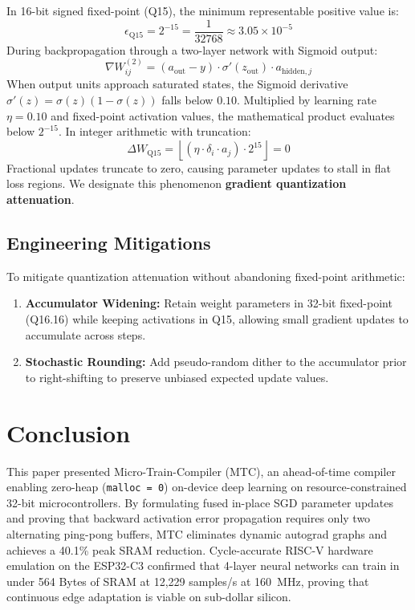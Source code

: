 \documentclass[conference]{IEEEtran}
\begin{document}
In 16-bit signed fixed-point (Q15), the minimum representable positive value is:
\begin{equation}
    \epsilon_{\text{Q15}} = 2^{-15} = \frac{1}{32768} \approx 3.05 \times 10^{-5}
\end{equation}
During backpropagation through a two-layer network with Sigmoid output:
\begin{equation}
    \nabla W_{ij}^{(2)} = (a_{\text{out}} - y) \cdot \sigma'(z_{\text{out}}) \cdot a_{\text{hidden}, j}
\end{equation}
When output units approach saturated states, the Sigmoid derivative $\sigma'(z) = \sigma(z)(1 - \sigma(z))$ falls below $0.10$. Multiplied by learning rate $\eta = 0.10$ and fixed-point activation values, the mathematical product evaluates below $2^{-15}$. In integer arithmetic with truncation:
\begin{equation}
    \Delta W_{\text{Q15}} = \left\lfloor (\eta \cdot \delta_i \cdot a_j) \cdot 2^{15} \right\rfloor = 0
\end{equation}
Fractional updates truncate to zero, causing parameter updates to stall in flat loss regions. We designate this phenomenon \textbf{gradient quantization attenuation}.

\subsection{Engineering Mitigations}
To mitigate quantization attenuation without abandoning fixed-point arithmetic:
\begin{enumerate}
    \item \textbf{Accumulator Widening:} Retain weight parameters in 32-bit fixed-point (Q16.16) while keeping activations in Q15, allowing small gradient updates to accumulate across steps.
    \item \textbf{Stochastic Rounding:} Add pseudo-random dither to the accumulator prior to right-shifting to preserve unbiased expected update values.
\end{enumerate}

\section{Conclusion}

This paper presented Micro-Train-Compiler (MTC), an ahead-of-time compiler enabling zero-heap (\texttt{malloc = 0}) on-device deep learning on resource-constrained 32-bit microcontrollers. By formulating fused in-place SGD parameter updates and proving that backward activation error propagation requires only two alternating ping-pong buffers, MTC eliminates dynamic autograd graphs and achieves a 40.1\% peak SRAM reduction. Cycle-accurate RISC-V hardware emulation on the ESP32-C3 confirmed that 4-layer neural networks can train in under 564 Bytes of SRAM at 12,229 samples/s at 160~MHz, proving that continuous edge adaptation is viable on sub-dollar silicon.
\end{document}
